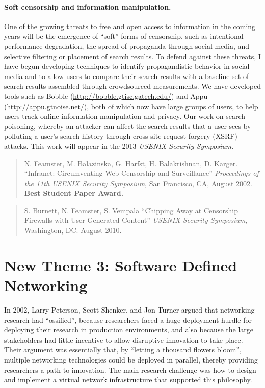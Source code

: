 \paragraph{Soft censorship and information manipulation.}
One of the growing threats to free and open access to information in the
coming years will be the emergence of ``soft'' forms of censorship, such
as intentional performance degradation, the spread of propaganda through
social media, and selective filtering or placement of search results.
To defend against these threats, I have begun developing techniques to
identify propagandistic behavior in social media and to allow users to
compare their search results with a baseline set of search results
assembled through crowdsourced measurements.  We have developed tools
such as Bobble (\url {http://bobble.gtisc.gatech.edu/}) and Appu
(\url{http://appu.gtnoise.net/}), both of which now have large groups of
users, to help users track online information manipulation and privacy.
Our work on search poisoning, whereby an attacker can affect the search
results that a user sees by polluting a user's search history through
cross-site request forgery (XSRF) attacks.  This work will appear in the
2013 {\em USENIX Security Symposium}.

\begin{quote}
N. Feamster, M. Balazinska, G. Harfst, H. Balakrishnan, D. Karger.
``Infranet: Circumventing Web Censorship and Surveillance''
{\em Proceedings of the 11th USENIX Security Symposium}, San Francisco,
CA, August 2002.  {\bf Best Student Paper Award.}
\end{quote}

\begin{quote}
S. Burnett, N. Feamster, S. Vempala
``Chipping Away at Censorship Firewalls with User-Generated Content''
{\em USENIX Security Symposium}, Washington, DC. August 2010. 
\end{quote}


\section*{New Theme 3: Software Defined Networking}

In 2002, Larry Peterson, Scott Shenker, and
Jon Turner argued that networking research had ``ossified'', because
researchers faced a huge deployment hurdle for deploying their research
in production environments, and also because the large stakeholders had
little incentive to allow disruptive innovation to take place.  Their
argument was essentially that, by ``letting a thousand flowers bloom'',
multiple networking technologies could be deployed in parallel, thereby
providing researchers a path to innovation.  The main research challenge
was how to design and implement a virtual network infrastructure that
supported this philosophy.  

